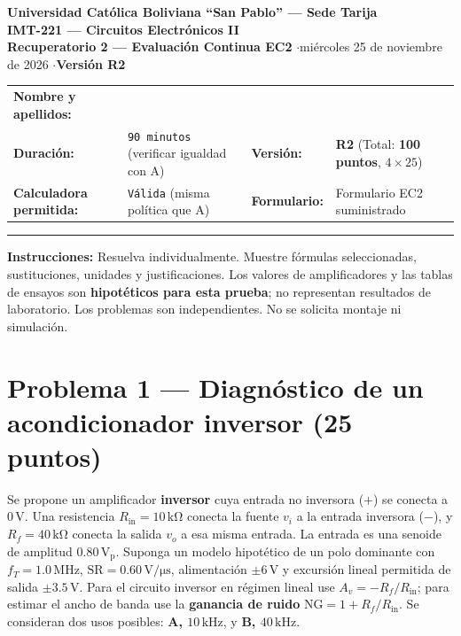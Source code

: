 \documentclass[10pt, a4paper]{article}
\begin{document}
\begin{center}
    {\large\textbf{\textcolor{ucbblue}{Universidad Católica Boliviana ``San Pablo'' --- Sede Tarija}}}\\[0.08cm]
    {\Large\textbf{IMT-221 --- Circuitos Electrónicos II}}\\
    {\normalsize\textbf{Recuperatorio 2 --- Evaluación Continua EC2} \quad$\cdot$\quad miércoles 25 de noviembre de 2026 \quad$\cdot$\quad \textbf{Versión R2}}
\end{center}

\begin{tcolorbox}[colback=neutralbg, colframe=ucbblue, boxrule=0.8pt, arc=1.5mm, left=6pt, right=6pt, top=5pt, bottom=5pt]
    \small
    \renewcommand{\arraystretch}{1.45}
    \begin{tabularx}{\textwidth}{@{}lX lX@{}}
        \textbf{Nombre y apellidos:} & \hrulefill \\
        \textbf{Duración:} & \texttt{90 minutos} {\scriptsize(verificar igualdad con A)} & \textbf{Versión:} & \textbf{R2} \quad (Total: \textbf{100 puntos}, $4 \times 25$) \\
        \textbf{Calculadora permitida:} & \texttt{Válida} {\scriptsize(misma política que A)} & \textbf{Formulario:} & Formulario EC2 suministrado \\
    \end{tabularx}
    \vspace{0.15cm}
    \hrule
    \vspace{0.15cm}
    \footnotesize
    \textbf{Instrucciones:} Resuelva individualmente. Muestre fórmulas seleccionadas, sustituciones, unidades y justificaciones. Los valores de amplificadores y las tablas de ensayos son \textbf{hipotéticos para esta prueba}; no representan resultados de laboratorio. Los problemas son independientes. No se solicita montaje ni simulación.
\end{tcolorbox}

\section*{Problema 1 --- Diagnóstico de un acondicionador inversor (25 puntos)}

Se propone un amplificador \textbf{inversor} cuya entrada no inversora ($+$) se conecta a $0\,\mathrm{V}$. Una resistencia $R_{\mathrm{in}} = 10\,\mathrm{k\Omega}$ conecta la fuente $v_i$ a la entrada inversora ($-$), y $R_f = 40\,\mathrm{k\Omega}$ conecta la salida $v_o$ a esa misma entrada. La entrada es una senoide de amplitud $0.80\,\mathrm{V_p}$. Suponga un modelo hipotético de un polo dominante con $f_T = 1.0\,\mathrm{MHz}$, $\mathrm{SR} = 0.60\,\mathrm{V/\mu s}$, alimentación $\pm 6\,\mathrm{V}$ y excursión lineal permitida de salida $\pm 3.5\,\mathrm{V}$. Para el circuito inversor en régimen lineal use $A_v = -R_f/R_{\mathrm{in}}$; para estimar el ancho de banda use la \textbf{ganancia de ruido} $\mathrm{NG} = 1 + R_f/R_{\mathrm{in}}$. Se consideran dos usos posibles: \textbf{A, $10\,\mathrm{kHz}$}, y \textbf{B, $40\,\mathrm{kHz}$}.
\end{document}
